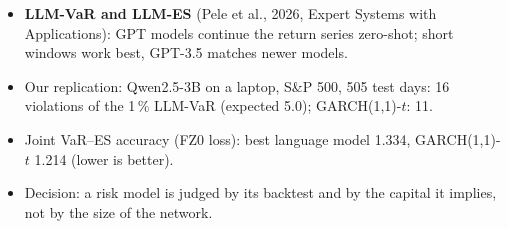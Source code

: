 \begin{itemize}\setlength{\itemsep}{2pt}
  \item \textbf{LLM-VaR and LLM-ES} (Pele et al., 2026, Expert Systems with Applications): GPT models continue the return series zero-shot; short windows work best, GPT-3.5 matches newer models.
  \item Our replication: Qwen2.5-3B on a laptop, S\&P 500, 505 test days: 16 violations of the 1\,\% LLM-VaR (expected 5.0); GARCH(1,1)-$t$: 11.
  \item Joint VaR--ES accuracy (FZ0 loss): best language model 1.334, GARCH(1,1)-$t$ 1.214 (lower is better).
  \item Decision: a risk model is judged by its backtest and by the capital it implies, not by the size of the network.
\end{itemize}
